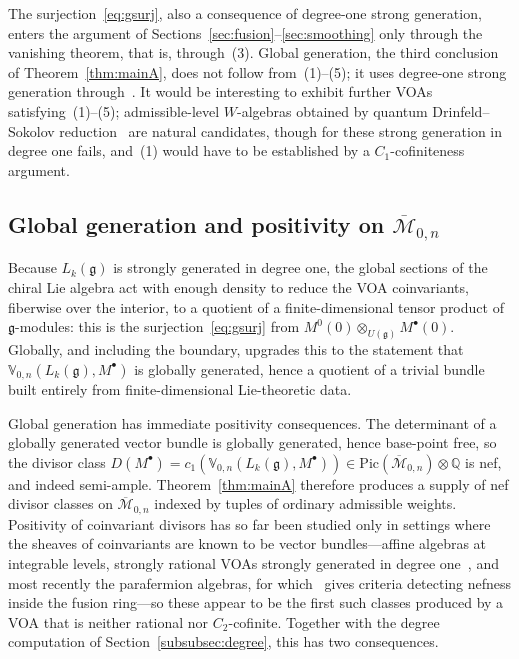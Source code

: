 \documentclass[12pt,a4paper,reqno]{amsart}
\numberwithin{equation}{section}
\theoremstyle{definition}
\newcommand{\g}{\mathfrak{g}}
\newcommand{\Q}{\mathbb{Q}}
\newcommand{\M}{\mathcal{M}}
\def\o{\otimes}
\def\VV{\mathbb{V}}
\begin{document}
The surjection~\eqref{eq:gsurj}, also a consequence of degree-one strong generation, enters the argument of Sections~\ref{sec:fusion}--\ref{sec:smoothing} only through the vanishing theorem, that is, through~(3). Global generation, the third conclusion of Theorem~\ref{thm:mainA}, does not follow from~(1)--(5); it uses degree-one strong generation through~\cite[Main theorem]{DG}. It would be interesting to exhibit further VOAs satisfying~(1)--(5); admissible-level $W$-algebras obtained by quantum Drinfeld--Sokolov reduction~\cite{A15,arakawa2015rationality} are natural candidates, though for these strong generation in degree one fails, and~(1) would have to be established by a $C_1$-cofiniteness argument.

\subsection{Global generation and positivity on $\overline{\M}_{0,n}$}\label{subsec:positivity}
Because $L_k(\g)$ is strongly generated in degree one, the global sections of the chiral Lie algebra act with enough density to reduce the VOA coinvariants, fiberwise over the interior, to a quotient of a finite-dimensional tensor product of $\g$-modules: this is the surjection~\eqref{eq:gsurj} from $M^0(0)\o_{U(\g)}M^\bullet(0)$. Globally, and including the boundary, \cite[Main theorem]{DG} upgrades this to the statement that $\VV_{0,n}(L_k(\g),M^\bullet)$ is globally generated, hence a quotient of a trivial bundle built entirely from finite-dimensional Lie-theoretic data.

Global generation has immediate positivity consequences. The determinant of a globally generated vector bundle is globally generated, hence base-point free, so the divisor class $D(M^\bullet)=c_1(\VV_{0,n}(L_k(\g),M^\bullet))\in \mathrm{Pic}(\overline{\M}_{0,n})\o \Q$ is nef, and indeed semi-ample. Theorem~\ref{thm:mainA} therefore produces a supply of nef divisor classes on $\overline{\M}_{0,n}$ indexed by tuples of ordinary admissible weights. Positivity of coinvariant divisors has so far been studied only in settings where the sheaves of coinvariants are known to be vector bundles---affine algebras at integrable levels, strongly rational VOAs strongly generated in degree one~\cite{DG}, and most recently the parafermion algebras, for which~\cite{Chakravarty25} gives criteria detecting nefness inside the fusion ring---so these appear to be the first such classes produced by a VOA that is neither rational nor $C_2$-cofinite. Together with the degree computation of Section~\ref{subsubsec:degree}, this has two consequences.
\end{document}

